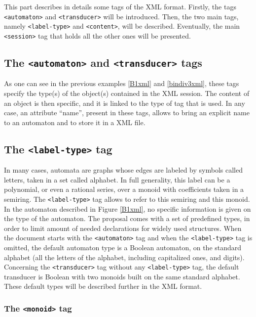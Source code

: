 \documentclass[a4paper]{article}
\def\typetag{\texttt{<label-type>}}
\def\contenttag{\texttt{<content>}}
\def\sessiontag{\texttt{<session>}}
\def\automatontag{\texttt{<automaton>}}
\def\transducertag{\texttt{<transducer>}}
\def\monoidtag{\texttt{<monoid>}}
\begin{document}
This part describes in details some tags of the XML format.
Firstly, the tags \automatontag{} and \transducertag{} will be introduced.
Then, the two main tags, namely \typetag{} and \contenttag{}, will be described.
Eventually, the main \sessiontag{} tag that holds all the other ones will be
presented.

\subsection{The \automatontag{} and \transducertag{} tags}

As one can see in the previous examples \ref{B1xml} and \ref{bindiv3xml}, these
tags specify the type(s) of the object(s) contained in the XML session. The content
of an object is then specific, and it is linked to the type of tag that is used.
In any case, an attribute ``name'', present in these tags, allows to bring an
explicit name to an automaton and to store it in a XML file.

\subsection{The \typetag{} tag}

In many cases, automata are graphs whose edges are labeled by symbols called
letters, taken in a set called alphabet. In full generality, this label can be
a polynomial, or even a rational series, over a monoid with coefficients taken in a
semiring. The \typetag{} tag allows to refer to this semiring and this monoid.\\

In the automaton described in Figure \ref{B1xml}, no specific
information is given on the type of the automaton. The proposal comes
with a set of predefined types, in order to limit amount of needed
declarations for widely used structures. When the document starts with
the \automatontag{} tag and when the \typetag{} tag is omitted,
the default automaton type is a Boolean automaton, on the standard
alphabet (all the letters of the alphabet, including capitalized ones, and digits).
Concerning the \transducertag{} tag without any \typetag{} tag, the default
transducer is Boolean with two monoids built on the same standard alphabet.
These default types will be described further in the XML format.


\subsubsection{The \monoidtag{} tag}
\end{document}
